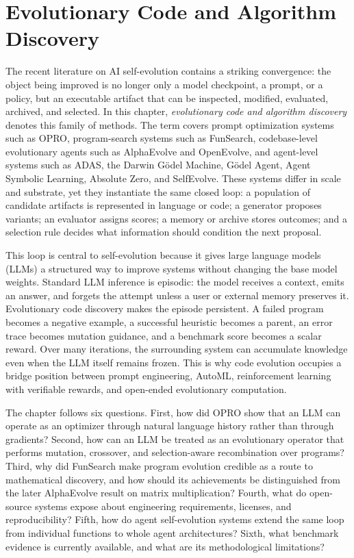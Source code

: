 
\section{Evolutionary Code and Algorithm Discovery}
\label{sec:evolutionary-code-algorithm-discovery}

The recent literature on AI self-evolution contains a striking convergence: the object being improved is no longer only a model checkpoint, a prompt, or a policy, but an executable artifact that can be inspected, modified, evaluated, archived, and selected.  In this chapter, \emph{evolutionary code and algorithm discovery} denotes this family of methods.  The term covers prompt optimization systems such as OPRO, program-search systems such as FunSearch, codebase-level evolutionary agents such as AlphaEvolve and OpenEvolve, and agent-level systems such as ADAS, the Darwin G{\"o}del Machine, G{\"o}del Agent, Agent Symbolic Learning, Absolute Zero, and SelfEvolve.  These systems differ in scale and substrate, yet they instantiate the same closed loop: a population of candidate artifacts is represented in language or code; a generator proposes variants; an evaluator assigns scores; a memory or archive stores outcomes; and a selection rule decides what information should condition the next proposal.

This loop is central to self-evolution because it gives large language models (LLMs) a structured way to improve systems without changing the base model weights.  Standard LLM inference is episodic: the model receives a context, emits an answer, and forgets the attempt unless a user or external memory preserves it.  Evolutionary code discovery makes the episode persistent.  A failed program becomes a negative example, a successful heuristic becomes a parent, an error trace becomes mutation guidance, and a benchmark score becomes a scalar reward.  Over many iterations, the surrounding system can accumulate knowledge even when the LLM itself remains frozen.  This is why code evolution occupies a bridge position between prompt engineering, AutoML, reinforcement learning with verifiable rewards, and open-ended evolutionary computation.

The chapter follows six questions.  First, how did OPRO show that an LLM can operate as an optimizer through natural language history rather than through gradients?  Second, how can an LLM be treated as an evolutionary operator that performs mutation, crossover, and selection-aware recombination over programs?  Third, why did FunSearch make program evolution credible as a route to mathematical discovery, and how should its achievements be distinguished from the later AlphaEvolve result on matrix multiplication?  Fourth, what do open-source systems expose about engineering requirements, licenses, and reproducibility?  Fifth, how do agent self-evolution systems extend the same loop from individual functions to whole agent architectures?  Sixth, what benchmark evidence is currently available, and what are its methodological limitations?

